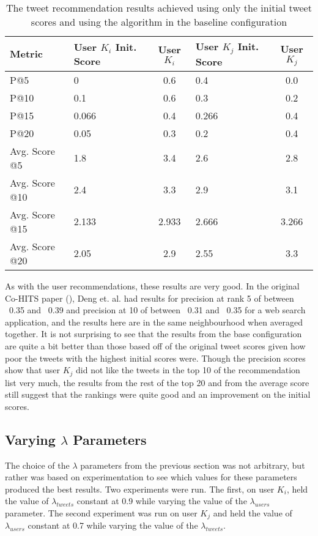 \begin{table}
\centering
\begin{tabular}{l|p{2.25cm}|c|p{2.25cm}|c}
{\bf Metric}& {\bf User $K_{i}$ Init. Score} & {\bf User $K_{i}$} & {\bf User $K_{j}$ Init. Score} & {\bf User $K_{j}$} \\ \hline
P@5   & 0 & 0.6 & 0.4 & 0.0 \\ \hline
P@10 & 0.1 & 0.6 & 0.3 & 0.2 \\ \hline
P@15 & 0.066 & 0.4 & 0.266 & 0.4 \\ \hline
P@20 & 0.05 & 0.3 & 0.2 & 0.4 \\ \hline
Avg. Score @5   & 1.8 & 3.4 & 2.6 & 2.8 \\ \hline
Avg. Score @10 & 2.4 & 3.3 & 2.9 & 3.1 \\ \hline
Avg. Score @15 & 2.133 & 2.933 & 2.666 & 3.266 \\ \hline
Avg. Score @20 & 2.05 & 2.9 & 2.55 & 3.3 \\
\end{tabular}
\caption{The tweet recommendation results achieved using only the initial tweet scores and using the algorithm in the baseline configuration}
\label{tab:BaseTweetResults}
\end{table}

As with the user recommendations, these results are very good. In the original Co-HITS paper (\cite{Deng2009}), Deng et. al. had results for precision at rank 5 of between ~0.35 and ~0.39 and precision at 10 of between ~0.31 and ~0.35 for a web search application, and the results here are in the same neighbourhood when averaged together. It is not surprising to see that the results from the base configuration are quite a bit better than those based off of the original tweet scores given how poor the tweets with the highest initial scores were. Though the precision scores show that user $K_{j}$ did not like the tweets in the top 10 of the recommendation list very much, the results from the rest of the top 20 and from the average score still suggest that the rankings were quite good and an improvement on the initial scores.



\subsection{Varying $\lambda$ Parameters}
\label{sec:VaryingLambda}

The choice of the $\lambda$ parameters from the previous section was not arbitrary, but rather was based on experimentation to see which values for these parameters produced the best results. Two experiments were run. The first, on user $K_{i}$, held the value of $\lambda_{tweets}$ constant at 0.9 while varying the value of the $\lambda_{users}$ parameter. The second experiment was run on user $K_{j}$ and held the value of $\lambda_{users}$ constant at 0.7 while varying the value of the $\lambda_{tweets}$.

